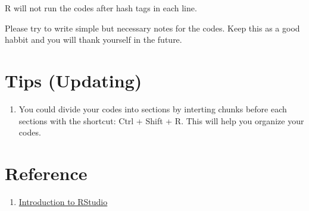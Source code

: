 \documentclass[]{book}
\providecommand{\tightlist}{%
  \setlength{\itemsep}{0pt}\setlength{\parskip}{0pt}}
\begin{document}
R will not run the codes after hash tags in each line.

Please try to write simple but necessary notes for the codes. Keep this as a good habbit and you will thank yourself in the future.

\hypertarget{tips-updating}{%
\section{Tips (Updating)}\label{tips-updating}}

\begin{enumerate}
\def\labelenumi{\arabic{enumi}.}
\tightlist
\item
  You could divide your codes into sections by interting chunks before each sections with the shortcut: Ctrl + Shift + R. This will help you organize your codes.
\end{enumerate}

\hypertarget{reference}{%
\section{Reference}\label{reference}}

\begin{enumerate}
\def\labelenumi{\arabic{enumi}.}
\tightlist
\item
  \href{https://datascienceplus.com/introduction-to-rstudio/}{Introduction to RStudio}
\end{enumerate}


\end{document}
